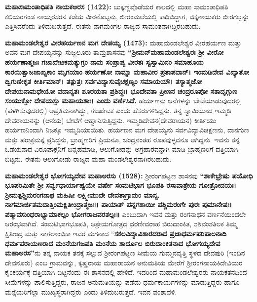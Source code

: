 \vskip -1pt

\textbf{ಮಹಾಸಾಮಂತಾಧಿಪತಿ ನಾಯಕಅರಸ (1422):} ಬುಕ್ಕಣ್ಣವೊಡೆಯರ ಕಾಲದಲ್ಲಿ ಮಹಾ ಸಾಮಂತಾಧಿಪತಿ ಕಲಿಯರಗಂಡ ನಾಯ್ಕರಸರನ ಕಡೆಯ ವೀರನೊಬ್ಬನು, ಬೀರಂಮಲೆಯಲ್ಲಿ ಕಾದಿಬಿದ್ದಾಗ, ಚಿಕ್ಕನಾಯಕರು ಬೀರಗಲ್ಲನ್ನು ಎತ್ತಿಸಿದರೆಂದು ತಿಳಿದುಬರುತ್ತದೆ. ಈತನು ನಾಗಮಂಗಲ ರಾಜ್ಯದ ಸಾಮಂತನಾಗಿದ್ದಿರಬಹುದು.

\vskip -1pt

\textbf{ಮಹಾಮಂಡಲೇಶ್ವರ ವೀರಹರ್ಯಣನ ಮಗ ದೇಪಯ್ಯ (1473):} ಮಹಾಮಂಡಲೇಶ್ವರ ವೀರಹರ್ಯಣ ಮತ್ತು ಅವನ ಮಗ ದೇಪಯ್ಯನನ್ನು ಸುಜ್ಜಲೂರು ತಾಮ್ರಶಾಸನವು \textbf{“ಶ‍್ರೀಮನ್​ ಮಹಾಮಂಡಲೇಶ್ವರಃ ಶ‍್ರೀ ವೀರೋ ಹರ್ಯಣಾತ್ಮಜಃ ಗಜಾಖೇಟಕಮತ್ಯುಗ್ರಂ ನಾಮ ಸಂಪ್ರಾಪ್ಯ ವೀರತಃ ಸ್ವಸ್ವಾಮಿನಂ ಸಮಾಹೂಯ ಕಾರಯಿತ್ವಾಜಜಾಖ್ಯಕಾಂ ಮೃಗಯಾಂ ಹರ್ಯಣೋ ನಾಮ್ನಾ ಮಹಾವೀರ ಪ್ರತಾಪವಾನ್​। ಇಂಮಡಿದೇವ ವಿಖ್ಯಾತೋ ದ್ವಿಗುಣೀಕೃತ ಕೀರ್ತಿಮಾನ್​। ತತ್ಪುತ್ರಃ ಸರ್ವವಿದ್ಯಾಸುವೈಚಕ್ಷಣ್ಯಂ ಸಮಾಯಯೌ। ತಸ್ಯಾತ್ಮಜೋ ದೇಪಯನಾಮಧೇಯೋ ವದಾನ್ಯತಃ ಶೂರಯತಾ ಪ್ರಶಿದ್ಧಃ। ಭೂದೇವತಾ ಪ್ರೀಣನ ಚಂದ್ರರೂಪೋ ಸತಾದೃಗ್ಗುಣ ಸಂಯುಕ್ತೋ ದೇಪಯಸ್ತು ಮಹಾಯಶಾಃ। ಎಂದು ವರ್ಣಿಸಿದೆ.} ಹರ್ಯಣನು ಆನೆಗಳನ್ನು ಬೇಟೆಯಾಡುವುದರಲ್ಲಿ (ಪಳಗಿಸುವುದರಲ್ಲಿ) ಅಪ್ರತಿಮನಾಗಿದ್ದು, ಗಜಖೇಟಕ ಎಂದು ಹೆಸರು\-ಗಳಿಸಿದ್ದನು. ತನ್ನ ಸ್ವಾಮಿಯಾದ ಇಮ್ಮಡಿ ದೇವರಾಯನನ್ನು (ಆನೆಯ) ಬೇಟೆಗೆ ಆಹ್ವಾನಿಸುತ್ತಿದ್ದನು. ಇಮ್ಮಡಿದೇವನ(ದೇವರಾಯನ) ಕೀರ್ತಿಯು ಹರ್ಯಣನಿಂದಾಗಿ ನಿಜಕ್ಕೂ ಇಮ್ಮಡಿಯಾಯಿತು. ಹರ್ಯಣನ ಮಗ ದೇಪಯ್ಯನು ಸರ್ವವಿದ್ಯಾವಿಚಕ್ಷಣನು, ದಾನಗುಣ ಮತ್ತು ಪರಾಕ್ರಮಕ್ಕೆ ಪ್ರಸಿದ್ಧನು, ಬ್ರಾಹ್ಮಣರಿಗೆ ಪ್ರಿಯನೂ, ಚಂದ್ರನಂತಹ ರೂಪವುಳ್ಳವನೂ ಆಗಿದ್ದನು. ಇವನು ತನ್ನ ಒಡೆಯನಾದ ವಿರೂಪಾಕ್ಷನಿಗೆ ಬಿನ್ನಹಮಾಡಿ, ಆಲುಗೋಡನ್ನು ಅಗ್ರಹಾರವನ್ನಾಗಿ ಮಾಡಿ ಬ್ರಾಹ್ಮಣರಿಗೆ ದತ್ತಿಯಾಗಿ ಬಿಟ್ಟನು. ಈತನು ಆಲುಗೋಡು ರಾಜ್ಯದ ಮಹಾ ಮಂಡಲೇಶ್ವರನಾಗಿರಬಹುದು.

\vskip -1pt

\textbf{ಮಹಾಮಂಡಲೇಶ್ವರ ಭೋಗಯ್ಯದೇವ ಮಹಾಅರಸು (1528):} ಶ‍್ರೀರಂಗಪಟ್ಟಣ ಶಾಸನವು \textbf{“ಶಾಕೇಭ್ರೇಷು ಪಯೋಧಿ ಭೂಪರಿಮಿತೇ ಶ‍್ರೀ ಸರ್ವ್ವಧಾರ್ಯಾಹ್ವಯೇ ವರ್ಷೇ ಸಂಮಟಿಭಾಗ ಭೂಪತಿ ರಸಾವಾತ್ರೇಯ ಗೋತ್ರೋದಯಃ। ಶ‍್ರೀಮತ್ಪಶ್ಚಿಮರಂಗನಾಥ ಮಹಿಷೀ ಲಕ್ಷ್ಮೀಮುದೇ ದೇವತಾಗ್ರಾಮಂ ಮಾನ್ಯ. ನಾಗಮಾರ್ಜಿತಮದಾತ್ತಿಂಮಕ್ಷಿತೀಂದ್ರಾತ್ಮಜಃ॥ ಪಾಯಾತ್​ ಪನ್ನಗಶಾಯೀ ಪಶ್ಚಿಮರಂಗೇ ಪುರಃ ಪುಮಾನೇಷಃ। ಪತ್ಮಾವಸುಂಧರಾಭ್ಯಾಮಾಕಲ್ಪಂ ಭೋಗರಾಜವರತಲ್ಪಃ॥} ಎಂಬುದಾಗಿ ಇವನ ಮತ್ತು ರಂಗನಾಥನ ವರ್ಣನೆಯಿಂದಲೇ ಆರಂಭವಾಗಿದೆ. ಸಂಮಟಿಭಾಗಭೂಪತಿ, ಆತ್ರೇಯಗೋತ್ರದ ಧರಣೀವರಾಹ ಬಿರುದಾಂಕಿತ, ಶಶಿವಂಶತಿಲಕ ತಿಮ್ಮ ಕ್ಷಿತೀಂದ್ರ ಮತ್ತು ನಾಗಲಾಂಬಿಕಾ ಇವರ ಮಗನಾದ “\textbf{ಸಕಲವಿದ್ಯಾವಿಶಾರದರಾದ ಪ್ರಜಾಧರ್ಮಪರಿಪಾಲನಾದಿ ಧರ್ಮಪರಾಯಣರಾದ ಮಂನೆಯಗಜಪತಿ ಮಂನೆಯ ಶಾರ್ದೂಲ ಬಿರುದಾಂಕಿತನಾದ\general{\break } ಭೋಗಯ್ಯದೇವ ಮಹಾಅರಸ”}ನು ತನ್ನ ನಾಯಕ ತನಕ್ಕೆ ಸಲ್ಲುವ ಶ‍್ರೀರಂಗಪಟ್ಟಣ ಸೀಮೆಯ ಗುಮ್ಮನವೃತ್ತಿ ಸ್ಥಳದ ದೇವಪುರಿ (ಇಂದಿನ ದೇವನೂರು) ಎಂಬ ಗ್ರಾಮವನ್ನು, ಕೃಷ್ಣರಾಯ ಮಹಾರಾಯನ ಅನುಮತಿಯ ಮೇರೆಗೆ ಶ‍್ರೀರಂಗನಾಯಕಿದೇವಿಯರ ಕೈಂಕರ್ಯಕ್ಕೆ ದತ್ತಿಯಾಗಿ ಬಿಟ್ಟನೆಂದು ಈ ಶಾಸನದಲ್ಲಿ ಹೇಳಿದೆ. ಇದರಿಂದ ಮಹಾಮಂಡಲೇಶ್ವರರು ನಾಯಕತನದಿಂದ ಸೀಮೆಗಳನ್ನು ಪಾಲಿಸುತ್ತಿದ್ದರು, ರಾಜನ ಅನುಮತಿಯನ್ನು ಪಡೆದು ಧರ್ಮಕಾರ್ಯಗಳನ್ನು ಮಾಡುತ್ತಿದ್ದರು ಹಾಗೂ ಮನ್ನೆಯರಿಗೆಲ್ಲಾ ಮುಖ್ಯಸ್ಥರಾಗಿದ್ದರು ಎಂದು ತಿಳಿದುಬರುತ್ತದೆ. ಇವನ ವಂಶಾವಳಿ.

